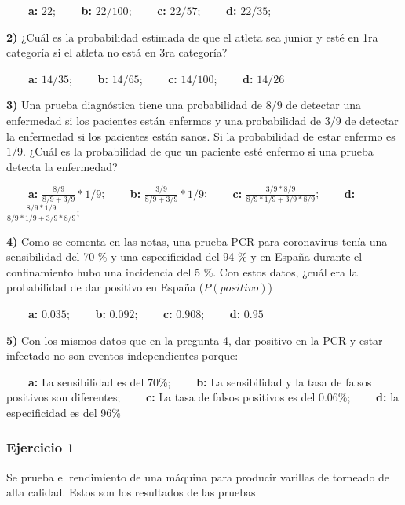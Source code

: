 \documentclass[
]{book}
\begin{document}
\textbf{\(\qquad\)a:} \(22\); \textbf{\(\qquad\)b:} \(22/100\); \textbf{\(\qquad\)c:} \(22/57\); \textbf{\(\qquad\)d:} \(22/35\);

\textbf{2)} ¿Cuál es la probabilidad estimada de que el atleta sea junior y esté en 1ra categoría si el atleta no está en 3ra categoría?

\textbf{\(\qquad\)a:} \(14/35\); \textbf{\(\qquad\)b:} \(14/65\); \textbf{\(\qquad\)c:} \(14/100\); \textbf{\(\qquad\)d:} \(14/26\)

\textbf{3)} Una prueba diagnóstica tiene una probabilidad de \(8/9\) de detectar una enfermedad si los pacientes están enfermos y una probabilidad de \(3/9\) de detectar la enfermedad si los pacientes están sanos. Si la probabilidad de estar enfermo es \(1/9\). ¿Cuál es la probabilidad de que un paciente esté enfermo si una prueba detecta la enfermedad?

\textbf{\(\qquad\)a:} \(\frac{8/9}{8/9+3/9}*1/9\); \textbf{\(\qquad\)b:} \(\frac{3/9}{8/9+3/9}*1/9\); \textbf{\(\qquad\)c:} \(\frac{3/9*8/9}{8/9*1/9+3/9*8/9}\); \textbf{\(\qquad\)d:} \(\frac{8/9*1/9}{8/9*1/9+3/9*8/9}\);

\textbf{4)} Como se comenta en las notas, una prueba PCR para coronavirus tenía una sensibilidad del 70 \% y una especificidad del 94 \% y en España durante el confinamiento hubo una incidencia del 5 \%. Con estos datos, ¿cuál era la probabilidad de dar positivo en España (\(P(positivo)\))

\textbf{\(\qquad\)a:} \(0.035\); \textbf{\(\qquad\)b:} \(0.092\); \textbf{\(\qquad\)c:} \(0.908\); \textbf{\(\qquad\)d:} \(0.95\)

\textbf{5)} Con los mismos datos que en la pregunta 4, dar positivo en la PCR y estar infectado no son eventos independientes porque:

\textbf{\(\qquad\)a:} La sensibilidad es del 70\%; \textbf{\(\qquad\)b:} La sensibilidad y la tasa de falsos positivos son diferentes; \textbf{\(\qquad\)c:} La tasa de falsos positivos es del 0.06\%; \textbf{\(\qquad\)d:} la especificidad es del 96\%

\hypertarget{ejercicio-1-1}{%
\subsubsection{Ejercicio 1}\label{ejercicio-1-1}}

Se prueba el rendimiento de una máquina para producir varillas de torneado de alta calidad. Estos son los resultados de las pruebas
\end{document}

